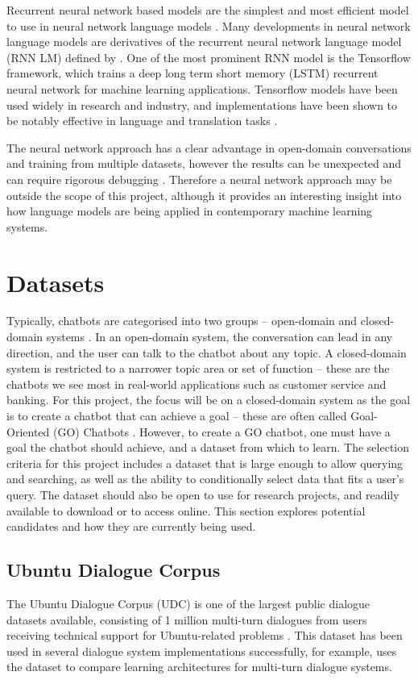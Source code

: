 Recurrent neural network based models are the simplest and most efficient model to use in neural network language models \cite{mikolov2010recurrent}. Many developments in neural network language models are derivatives of the recurrent neural network language model (RNN LM) defined by \citet{mikolov2010recurrent}. One of the most prominent RNN model is the Tensorflow framework, which trains a deep long term short memory (LSTM) recurrent neural network \cite{abadi2016tensorflow} for machine learning applications. Tensorflow models have been used widely in research and industry, and implementations have been shown to be notably effective in language and translation tasks \cite{wu2016google}.

The neural network approach has a clear advantage in open-domain conversations and training from multiple datasets, however the results can be unexpected and can require rigorous debugging \cite{pascanu2013difficulty}. Therefore a neural network approach may be outside the scope of this project, although it provides an interesting insight into how language models are being applied in contemporary machine learning systems. 

\newpage
\section{Datasets}
Typically, chatbots are categorised into two groups -- open-domain and closed-domain systems \cite{ilievski2018building}. In an open-domain system, the conversation can lead in any direction, and the user can talk to the chatbot about any topic. A closed-domain system is restricted to a narrower topic area or set of function -- these are the chatbots we see most in real-world applications such as customer service and banking. For this project, the focus will be on a closed-domain system as the goal is to create a chatbot that can achieve a goal -- these are often called Goal-Oriented (GO) Chatbots \cite{ilievski2018building}. However, to create a GO chatbot, one must have a goal the chatbot should achieve, and a dataset from which to learn. The selection criteria for this project includes a dataset that is large enough to allow querying and searching, as well as the ability to conditionally select data that fits a user's query. The dataset should also be open to use for research projects, and readily available to download or to access online. This section explores potential candidates and how they are currently being used.


\subsection{Ubuntu Dialogue Corpus}
The Ubuntu Dialogue Corpus (UDC) is one of the largest public dialogue datasets available, consisting of 1 million multi-turn dialogues from users receiving technical support for Ubuntu-related problems \cite{lowe2015ubuntu}. This dataset has been used in several dialogue system implementations successfully, for example, \citet{lowe2015ubuntu} uses the dataset to compare learning architectures for multi-turn dialogue systems. 

